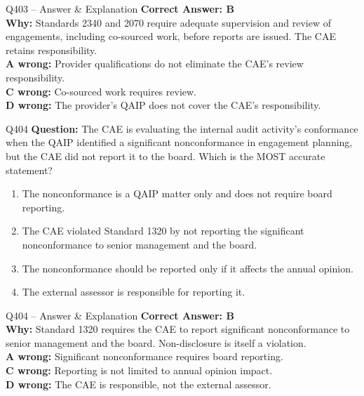 \documentclass[aspectratio=169,10pt]{beamer}
\begin{document}
	\begin{frame}[t]{Q403 -- Answer \& Explanation}
		\small
		\textbf{Correct Answer: B} \\[4pt]
		\textbf{Why:} Standards 2340 and 2070 require adequate supervision and review of engagements, including co-sourced work, before reports are issued. The CAE retains responsibility. \\[4pt]
		\textbf{A wrong:} Provider qualifications do not eliminate the CAE's review responsibility. \\[2pt]
		\textbf{C wrong:} Co-sourced work requires review. \\[2pt]
		\textbf{D wrong:} The provider's QAIP does not cover the CAE's responsibility.
	\end{frame}
	
	\begin{frame}[t]{Q404}
		\small
		\textbf{Question:} The CAE is evaluating the internal audit activity's conformance when the QAIP identified a significant nonconformance in engagement planning, but the CAE did not report it to the board. Which is the MOST accurate statement?
		\begin{enumerate}[label=\Alph*.,itemsep=1pt,topsep=2pt]
			\item The nonconformance is a QAIP matter only and does not require board reporting.
			\item The CAE violated Standard 1320 by not reporting the significant nonconformance to senior management and the board.
			\item The nonconformance should be reported only if it affects the annual opinion.
			\item The external assessor is responsible for reporting it.
		\end{enumerate}
	\end{frame}
	
	\begin{frame}[t]{Q404 -- Answer \& Explanation}
		\small
		\textbf{Correct Answer: B} \\[4pt]
		\textbf{Why:} Standard 1320 requires the CAE to report significant nonconformance to senior management and the board. Non-disclosure is itself a violation. \\[4pt]
		\textbf{A wrong:} Significant nonconformance requires board reporting. \\[2pt]
		\textbf{C wrong:} Reporting is not limited to annual opinion impact. \\[2pt]
		\textbf{D wrong:} The CAE is responsible, not the external assessor.
	\end{frame}
	
\end{document}
